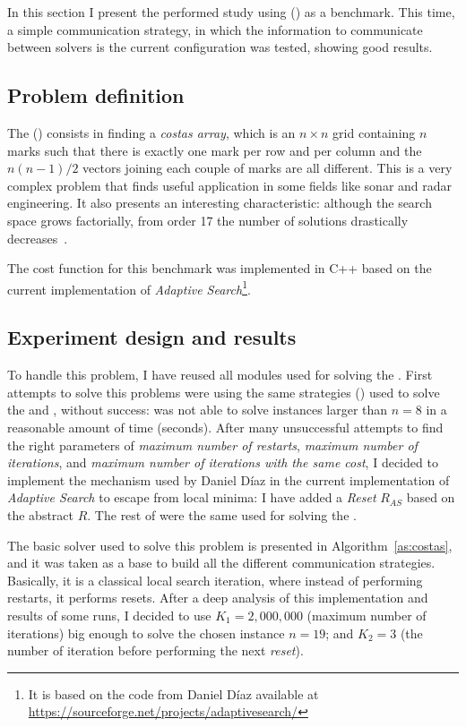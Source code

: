 In this section I present the performed study using \carrp{} (\CARRP) as a benchmark. This time, a simple communication strategy, in which the information to communicate between solvers is the current configuration was tested, showing good results.

\subsection{Problem definition}

The \carrp{} (\CARRP) consists in finding a \textit{costas array}, which is an $n\times n$ grid containing $n$ marks such that there is exactly one mark per row and per column and the $n(n-1)/2$ vectors joining each couple of marks are all different. This is a very complex problem that finds useful application in some fields like sonar and radar engineering. It also presents an interesting characteristic: although the search space grows factorially, from order 17 the number of solutions drastically decreases~\cite{Drakakis2006}.

The cost function for this benchmark was implemented in C++ based on the current implementation of {\it Adaptive Search}\footnote{It is based on the code from Daniel D\'{i}az available at \href{https://sourceforge.net/projects/adaptivesearch/}{https://sourceforge.net/projects/adaptivesearch/}}.

\subsection{Experiment design and results}

To handle this problem, I have reused all modules used for solving the \nqp. First attempts to solve this problems were using the same strategies (\ass) used to solve the \sgp{} and \nqp, without success: \posl{} was not able to solve instances larger than $n = 8$ in a reasonable amount of time (seconds). After many unsuccessful attempts to find the right parameters of \textit{maximum number of restarts}, \textit{maximum number of iterations}, and \textit{maximum number of iterations with the same cost}, I decided to implement the mechanism used by Daniel D\'iaz in the current implementation of {\it Adaptive Search} to escape from local minima: I have added a {\it Reset} \om{} $R_{AS}$ based on the abstract \om{} $R$. The rest of \oms{} were the same used for solving the \nqp.

The basic solver used to solve this problem is presented in Algorithm~\ref{as:costas}, and it was taken as a base to build all the different communication strategies. Basically, it is a classical local search iteration, where instead of performing restarts, it performs resets. After a deep analysis of this implementation and results of some runs, I decided to use $K_1 = 2,000,000$ (maximum number of iterations) big enough to solve the chosen instance $n = 19$; and $K_2 = 3$ (the number of iteration before performing the next \textit{reset}).

